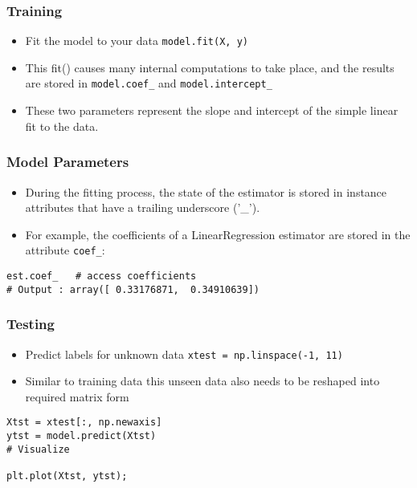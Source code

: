 \begin{frame}[fragile]\frametitle{Training}
\begin{itemize}
\item Fit the model to your data \lstinline|model.fit(X, y)|
\item This fit() causes many internal computations to take place, and the results are stored in \lstinline|model.coef_| and \lstinline|model.intercept_|
\item These two parameters represent the slope and intercept of the simple linear fit to the data. 
\end{itemize}
\end{frame}

\begin{frame}[fragile]\frametitle{Model Parameters}
\begin{itemize}
\item During the fitting process, the state of the estimator is stored in instance attributes that have a trailing underscore ('\_'). 
\item For example, the coefficients of a LinearRegression estimator are stored in the attribute \texttt{coef\_}:
\end{itemize}

\begin{lstlisting}
est.coef_   # access coefficients
# Output : array([ 0.33176871,  0.34910639])
\end{lstlisting}
\end{frame}


\begin{frame}[fragile]\frametitle{Testing}
\begin{itemize}
\item Predict labels for unknown data \lstinline|xtest = np.linspace(-1, 11)|
\item Similar to training data this unseen data also needs to be reshaped into required matrix form
\end{itemize}

\begin{lstlisting}
Xtst = xtest[:, np.newaxis]
ytst = model.predict(Xtst)
# Visualize

plt.plot(Xtst, ytst);
\end{lstlisting}
\end{frame}

